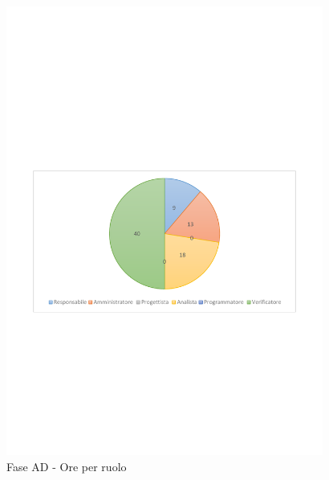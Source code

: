 \documentclass[../PianoProgetto.tex]{subfiles}
\begin{document}
	\begin{figure}[!h]
		\centering
		\includegraphics[width=0.93\textwidth , trim=2cm 9.5cm 2cm 11cm]{grafici/AD/AD-ore-ruolo}
			\caption{Fase AD - Ore per ruolo}
		\label{fig:CircleChart-faseAD_ore_r}
	\end{figure}
\vfill
\end{document}
